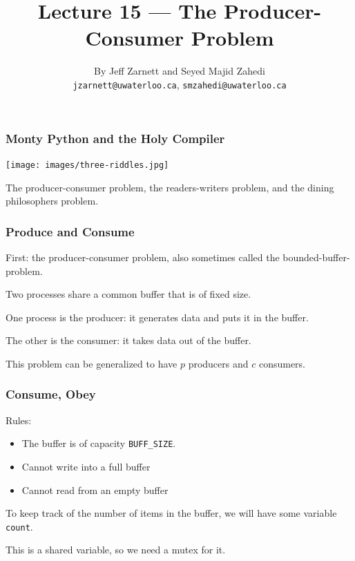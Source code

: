 

\title{Lecture 15 --- The Producer-Consumer Problem }

\author{By Jeff Zarnett and Seyed Majid Zahedi \\ \small \texttt{jzarnett@uwaterloo.ca}, \texttt{smzahedi@uwaterloo.ca}}
\date{}




\begin{frame}
	\titlepage

\end{frame}


\begin{frame}
	\frametitle{Monty Python and the Holy Compiler}

	\begin{center}
		\texttt{[image: images/three-riddles.jpg]}
	\end{center}

	The producer-consumer problem, the readers-writers problem, and the dining philosophers problem.

\end{frame}


\begin{frame}
	\frametitle{Produce and Consume}

	First: the producer-consumer problem, also sometimes called the bounded-buffer-problem.

	Two processes share a common buffer that is of fixed size.

	One process is the producer: it generates data and puts it in the buffer.

	The other is the consumer: it takes data out of the buffer.

	This problem can be generalized to have $p$ producers and $c$ consumers.

\end{frame}

\begin{frame}
	\frametitle{Consume, Obey}

	Rules:
	\begin{itemize}
		\item The buffer is of capacity \texttt{BUFF\_SIZE}.
		\item Cannot write into a full buffer
		\item Cannot read from an empty buffer
	\end{itemize}

	To keep track of the number of items in the buffer, we will have some variable \texttt{count}.

	This is a shared variable, so we need a mutex for it.

\end{frame}


